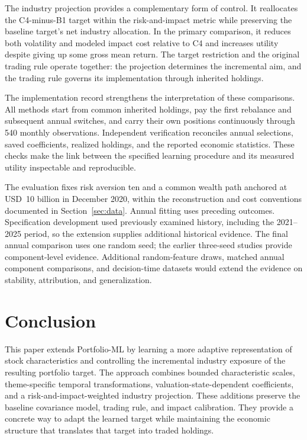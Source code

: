 \documentclass[12pt,letterpaper,fleqn]{article}
\begin{document}
The industry projection provides a complementary form of control. It reallocates the C4-minus-B1 target within the risk-and-impact metric while preserving the baseline target's net industry allocation. In the primary comparison, it reduces both volatility and modeled impact cost relative to C4 and increases utility despite giving up some gross mean return. The target restriction and the original trading rule operate together: the projection determines the incremental aim, and the trading rule governs its implementation through inherited holdings.

The implementation record strengthens the interpretation of these comparisons. All methods start from common inherited holdings, pay the first rebalance and subsequent annual switches, and carry their own positions continuously through 540 monthly observations. Independent verification reconciles annual selections, saved coefficients, realized holdings, and the reported economic statistics. These checks make the link between the specified learning procedure and its measured utility inspectable and reproducible.

The evaluation fixes risk aversion ten and a common wealth path anchored at USD~10 billion in December 2020, within the reconstruction and cost conventions documented in Section~\ref{sec:data}. Annual fitting uses preceding outcomes. Specification development used previously examined history, including the 2021--2025 period, so the extension supplies additional historical evidence. The final annual comparison uses one random seed; the earlier three-seed studies provide component-level evidence. Additional random-feature draws, matched annual component comparisons, and decision-time datasets would extend the evidence on stability, attribution, and generalization.

\section{Conclusion}
This paper extends Portfolio-ML by learning a more adaptive representation of stock characteristics and controlling the incremental industry exposure of the resulting portfolio target. The approach combines bounded characteristic scales, theme-specific temporal transformations, valuation-state-dependent coefficients, and a risk-and-impact-weighted industry projection. These additions preserve the baseline covariance model, trading rule, and impact calibration. They provide a concrete way to adapt the learned target while maintaining the economic structure that translates that target into traded holdings.
\end{document}
